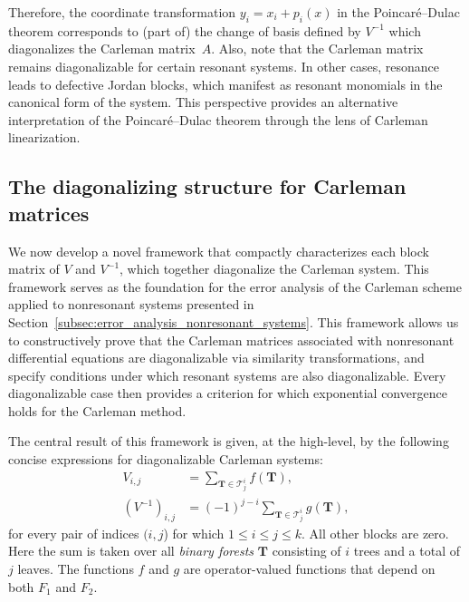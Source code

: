 \documentclass[superscriptaddress,onecolumn,nofootinbib,longbibliography,a4paper,accepted=2026-09-29]{quantumarticle}
\theoremstyle{plain}
\theoremstyle{definition}
\numberwithin{thm}{section}
\numberwithin{assumption}{section}
\numberwithin{lemma}{section}
\numberwithin{prop}{section}
\numberwithin{cor}{section}
\numberwithin{definition}{section}
\numberwithin{rmk}{section}
\numberwithin{equation}{section}
\begin{document}
Therefore, the coordinate transformation $y_i = x_i + p_i(x)$ in the Poincar\'{e}–Dulac theorem corresponds to (part of) the change of basis defined by $V^{-1}$ which  diagonalizes the Carleman matrix~$A$. Also, note that the Carleman matrix remains diagonalizable for certain resonant systems. In other cases, resonance leads to defective Jordan blocks, which manifest as resonant monomials in the canonical form of the system. This perspective provides an alternative interpretation of the Poincar\'{e}–Dulac theorem through the lens of Carleman linearization.



\subsection{The diagonalizing structure for Carleman matrices}
\label{subsec:carleman_matrix_diagonalization}

We now develop a novel framework that compactly characterizes each block matrix of $V$ and $V^{-1}$, which together diagonalize the Carleman system. This framework serves as the foundation for the error analysis of the Carleman scheme applied to nonresonant systems presented in Section~\ref{subsec:error_analysis_nonresonant_systems}. This framework allows us to constructively prove that the Carleman matrices associated with nonresonant differential equations are diagonalizable via similarity transformations, and specify conditions under which resonant systems are also diagonalizable. Every diagonalizable case then provides a criterion for which exponential convergence holds for the Carleman method.

The central result of this framework is given, at the high-level, by the following concise expressions for diagonalizable Carleman systems:
\begin{align}
    V_{i,j} & = \sum_{\mathbf{T}\in \mathcal{T}^i_j} f(\mathbf{T}), 
    \label{eq:V_structure}\\
    (V^{-1})_{i,j} & = (-1)^{j-i}\sum_{\mathbf{T}\in \mathcal{T}^i_j} g(\mathbf{T}),
    \label{eq:V_Vinverse_structure}
\end{align}
for every pair of indices $(i,j$) for which $1\le i\le j \le k$. All other blocks are zero. Here the sum is taken over all \emph{binary forests} $\mathbf{T}$ consisting of  $i$ trees and a total of $j$ leaves. The functions $f$ and $g$ are operator-valued functions that depend on both $F_1$ and $F_2$. 
\end{document}
